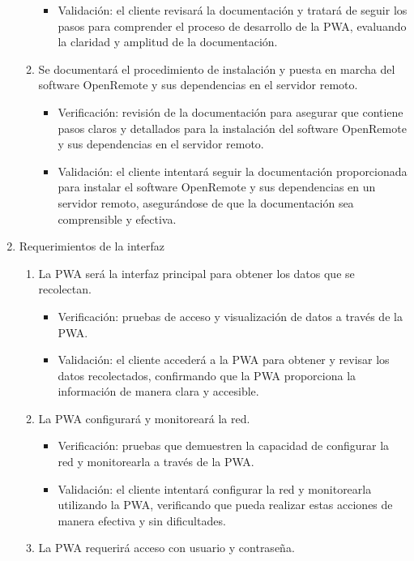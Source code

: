 \documentclass[
11pt, %
]{charter}
\begin{document}
\begin{enumerate}
\begin{enumerate}
\begin{itemize}
				\item Validación: el cliente revisará la documentación y tratará de seguir los pasos para comprender el proceso de desarrollo de la PWA, evaluando la claridad y amplitud de la documentación.
			\end{itemize}
			\item Se documentará el procedimiento de instalación y puesta en marcha del software OpenRemote y sus dependencias en el servidor remoto.
			\begin{itemize}
				\item Verificación: revisión de la documentación para asegurar que contiene pasos claros y detallados para la instalación del software OpenRemote y sus dependencias en el servidor remoto.
				\item Validación: el cliente intentará seguir la documentación proporcionada para instalar el software OpenRemote y sus dependencias en un servidor remoto, asegurándose de que la documentación sea comprensible y efectiva.
			\end{itemize}
		\end{enumerate}
	\item Requerimientos de la interfaz
		\begin{enumerate}
			\item La PWA será la interfaz principal para obtener los datos que se recolectan.
			\begin{itemize}
				\item Verificación: pruebas de acceso y visualización de datos a través de la PWA.
				\item Validación: el cliente accederá a la PWA para obtener y revisar los datos recolectados, confirmando que la PWA proporciona la información de manera clara y accesible.
			\end{itemize}
			\item La PWA configurará y monitoreará la red.
			\begin{itemize}
				\item Verificación: pruebas que demuestren la capacidad de configurar la red y monitorearla a través de la PWA.
				\item Validación: el cliente intentará configurar la red y monitorearla utilizando la PWA, verificando que pueda realizar estas acciones de manera efectiva y sin dificultades.
			\end{itemize} 
			\item La PWA requerirá acceso con usuario y contraseña.
			\begin{itemize}

\end{itemize}
\end{enumerate}
\end{enumerate}
\end{document}
